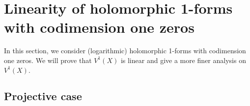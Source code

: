 \documentclass[a4paper,12pt,reqno]{amsart}
\theoremstyle{plain}
\theoremstyle{definition}
\theoremstyle{remark}
\begin{document}




\section{Linearity of holomorphic 1-forms with codimension one zeros}

In this section, we consider (logarithmic) holomorphic 1-forms with codimension one zeros. We will prove that $V^1(X)$ is linear and give a more finer analysis on $V^1(X)$. 

\subsection{Projective case}
\end{document}
